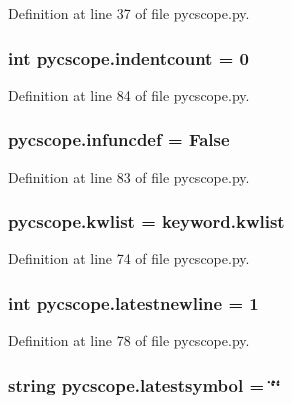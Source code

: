 Definition at line 37 of file pycscope.\-py.

\hypertarget{namespacepycscope_ac1336c917bd5aa8bb13fd24edfe01079}{
\subsubsection[{indentcount}]{\setlength{\rightskip}{0pt plus 5cm}int pycscope.\-indentcount = 0}}\label{namespacepycscope_ac1336c917bd5aa8bb13fd24edfe01079}


Definition at line 84 of file pycscope.\-py.

\hypertarget{namespacepycscope_aea05d92402ffc86a81655884355d7090}{
\subsubsection[{infuncdef}]{\setlength{\rightskip}{0pt plus 5cm}pycscope.\-infuncdef = False}}\label{namespacepycscope_aea05d92402ffc86a81655884355d7090}


Definition at line 83 of file pycscope.\-py.

\hypertarget{namespacepycscope_ae6ee50ac1c7b31d0ca859b81311cbcee}{
\subsubsection[{kwlist}]{\setlength{\rightskip}{0pt plus 5cm}pycscope.\-kwlist = keyword.\-kwlist}}\label{namespacepycscope_ae6ee50ac1c7b31d0ca859b81311cbcee}


Definition at line 74 of file pycscope.\-py.

\hypertarget{namespacepycscope_acf630fd0ccc23fcb814b562c780629f5}{
\subsubsection[{latestnewline}]{\setlength{\rightskip}{0pt plus 5cm}int pycscope.\-latestnewline = 1}}\label{namespacepycscope_acf630fd0ccc23fcb814b562c780629f5}


Definition at line 78 of file pycscope.\-py.

\hypertarget{namespacepycscope_a799f69f0ccef70661fe41a0505d074e8}{
\subsubsection[{latestsymbol}]{\setlength{\rightskip}{0pt plus 5cm}string pycscope.\-latestsymbol = \char`\"{}\char`\"{}}}\label{namespacepycscope_a799f69f0ccef70661fe41a0505d074e8}


